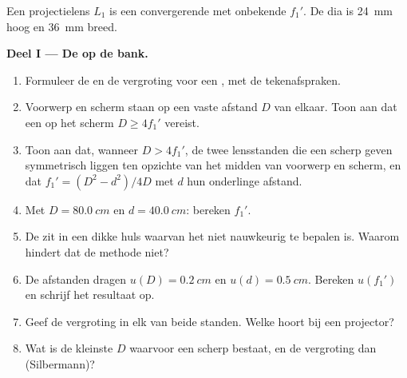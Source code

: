 \begin{problem}
\label{pb:b1:mirrors-thin-lenses:1}
Een projectielens $L_1$ is een convergerende  met onbekende
 $f_1'$. De dia is \qty{24}{mm} hoog en \qty{36}{mm} breed.

\medskip
\noindent\textbf{Deel I --- De  op de bank.}
\begin{enumerate}
  \item Formuleer de  en de vergroting voor een
        , met de tekenafspraken.
  \item Voorwerp en scherm staan op een vaste afstand $D$ van elkaar. Toon
        aan dat een  op het scherm $D \geq 4f_1'$ vereist.
  \item Toon aan dat, wanneer $D > 4f_1'$, de twee lensstanden die een
        scherp  geven symmetrisch liggen ten opzichte van het midden
        van voorwerp en scherm, en dat $f_1' = (D^2 - d^2)/4D$ met $d$
        hun onderlinge afstand.
  \item Met $D = \qty{80.0}{cm}$ en $d = \qty{40.0}{cm}$: bereken
        $f_1'$.
  \item De  zit in een dikke huls waarvan het  niet
        nauwkeurig te bepalen is. Waarom hindert dat de methode niet?
  \item De afstanden dragen $u(D) = \qty{0.2}{cm}$ en
        $u(d) = \qty{0.5}{cm}$. Bereken $u(f_1')$ en schrijf het resultaat op.
  \item Geef de vergroting in elk van beide standen. Welke hoort bij een
        projector?
  \item Wat is de kleinste $D$ waarvoor een scherp  bestaat, en de
        vergroting dan (Silbermann)?
\end{enumerate}


\end{problem}
